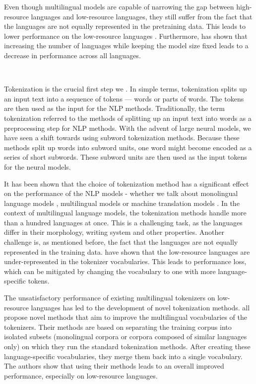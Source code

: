 Even though multilingual models are capable of narrowing the gap between high-resource languages and low-resource languages, they still suffer from the fact that the languages are not equally represented in the pretraining data. This leads to lower performance on the low-resource languages \cite{conneau_unsupervised_2020}. Furthermore, \citet{conneau_unsupervised_2020} has shown that increasing the number of languages while keeping the model size fixed leads to a decrease in performance across all languages. \cite{conneau_unsupervised_2020}

~

Tokenization is the crucial first step we .
 In simple terms, tokenization splits up an input text into a sequence of tokens --- words or parts of words. The tokens are then used as the input for the NLP methods. Traditionally, the term tokenization referred to the methods of splitting up an input text into words as a preprocessing step for NLP methods. With the advent of large neural models, we have seen a shift towards using subword tokenization methods. Because these methods split up words into subword units, one word might become encoded as a series of short subwords. These subword units are then used as the input tokens for the neural models. 

It has been shown that the choice of tokenization method has a significant effect on the performance of the NLP models - whether we talk about monolingual language models \cite{bostrom_byte_2020}, multilingual models \cite{rust_how_2021} or machine translation models \cite{kudo_sentencepiece_2018,gowda_finding_2020}. In the context of multilingual language models, the tokenization methods handle more than a hundred languages at once. This is a challenging task, as the languages differ in their morphology, writing system and other properties. Another challenge is, as mentioned before, the fact that the languages are not equally represented in the training data. \citet{rust_how_2021} have shown that the low-resource languages are under-represented in the tokenizer vocabularies. This leads to performance loss, which can be mitigated by changing the vocabulary to one with more language-specific tokens. \cite{rust_how_2021}

The unsatisfactory performance of existing multilingual tokenizers on low-resource languages has led to the development of novel tokenization methods. \citet{chung_improving_2020,zheng_allocating_2021,liang_xlm-v_2023} all propose novel methods that aim to improve the multilingual vocabularies of the tokenizers. Their methods are based on separating the training corpus into isolated subsets (monolingual corpora or corpora composed of similar languages only) on which they run the standard tokenization methods. After creating these language-specific vocabularies, they merge them back into a single vocabulary. The authors show that using their methods leads to an overall improved performance, especially on low-resource languages.

